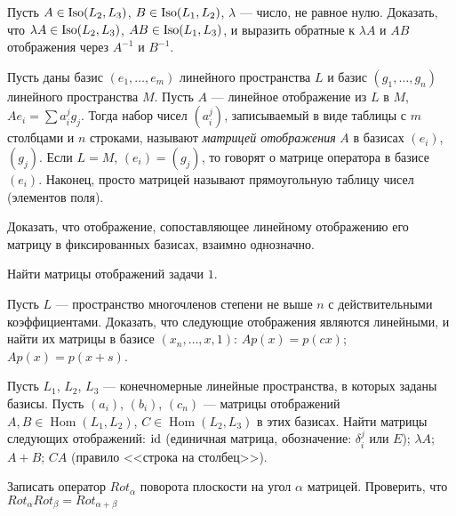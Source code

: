 \documentclass[12pt]{article}
\DeclareMathOperator{\Hom}{Hom}
\newcommand{\Iso}{{\rm Iso}}
\newcommand{\id}{{\rm{id}}}
\begin{document}
\z Пусть $A \in \Iso(L_2 , L_3)$, $B \in \Iso(L_1, L_2)$, $\lambda$ --- число, не равное нулю.
Доказать, что $\lambda A \in \Iso(L_2 , L_3)$, $AB \in \Iso(L_1, L_3)$,
и выразить обратные к $\lambda A$ и $AB$ отображения через $A^{-1}$ и $B^{-1}$.




 Пусть даны базис $(e_1, \dots, e_m)$ линейного пространства $L$
и базис $(g_1, \dots, g_n)$ линейного пространства $M$.
Пусть $A$ --- линейное отображение из $L$ в $M$, $Ae_i = \sum a_i^j g_j$.
Тогда набор чисел $(a_i^j )$,
записываемый в виде таблицы с $m$ столбцами и $n$ строками, называют
{\it матрицей отображения} $A$ в базисах $(e_i)$, $(g_j)$.
Если $L = M$, $(e_i) = (g_j)$, то
говорят о матрице оператора в базисе $(e_i)$.
Наконец, просто матрицей
называют прямоугольную таблицу чисел (элементов поля).

\z Доказать, что отображение, сопоставляющее линейному
отображению его матрицу в фиксированных базисах, взаимно однозначно.

\z Найти матрицы отображений задачи $1$.

\z Пусть $L$ --- пространство многочленов степени не выше
$n$ с действительными коэффициентами. Доказать, что следующие
отображения являются линейными, и найти их матрицы в базисе
$(x_n, \dots, x, 1)$:
	\p $Ap(x) = p(cx)$;
	\p $Ap(x) = p(x + s)$.

\z Пусть $L_1$, $L_2$, $L_3$ --- конечномерные линейные пространства,
в которых заданы базисы.
Пусть $(a_i)$, $(b_i)$, $(c_n)$ --- матрицы отображений
$A, B \in \Hom(L_1 , L_2)$,
$C \in \Hom(L_2, L_3)$ в этих базисах.
Найти матрицы следующих отображений:
	\p $\id$ (единичная матрица, обозначение: $\delta_i^j$ или $E$);
	\p $\lambda A$;
	\p $A + B$;
	\p $CA$ (правило <<строка на столбец>>).



\z \p Записать оператор $Rot_\alpha$ поворота плоскости на угол $\alpha$ матрицей.
	\p Проверить, что $Rot_\alpha Rot_\beta = Rot_{\alpha+\beta}$
\end{document}
